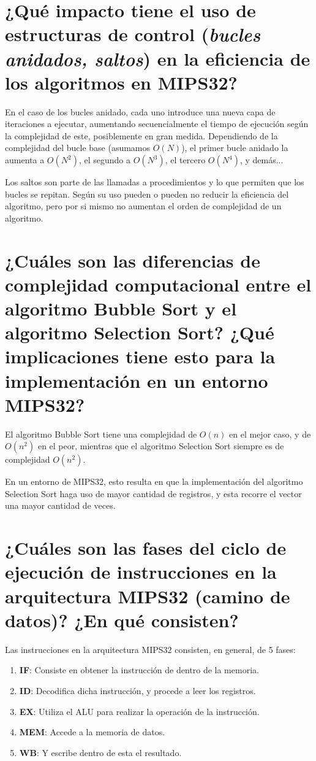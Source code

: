 \documentclass[titlepage]{article}
\begin{document}
\section*{¿Qué impacto tiene el uso de estructuras de control (\emph{bucles anidados, saltos}) en la eficiencia de los algoritmos en MIPS32?}

En el caso de los bucles anidado, cada uno introduce una nueva capa de iteraciones a ejecutar, aumentando secuencialmente el tiempo de ejecución según la complejidad de este, posiblemente en gran medida. Dependiendo de la complejidad del bucle base (asumamos $O(N)$), el primer bucle anidado la aumenta a $O(N^2)$, el segundo a $O(N^3)$, el tercero $O(N^4)$, y demás...

Los saltos son parte de las llamadas a procedimientos y lo que permiten que los bucles se repitan. Según su uso pueden o pueden no reducir la eficiencia del algoritmo, pero por si mismo no aumentan el orden de complejidad de un algoritmo.

\section*{¿Cuáles son las diferencias de complejidad computacional entre el algoritmo Bubble Sort y el algoritmo Selection Sort? ¿Qué implicaciones tiene esto para la implementación en un entorno MIPS32?}

El algoritmo Bubble Sort tiene una complejidad de $O(n)$ en el mejor caso, y de $O(n^2)$ en el peor, mientras que el algoritmo Selection Sort siempre es de complejidad $O(n^2)$.

En un entorno de MIPS32, esto resulta en que la implementación del algoritmo Selection Sort haga uso de mayor cantidad de registros, y esta recorre el vector una mayor cantidad de veces.

\section*{¿Cuáles son las fases del ciclo de ejecución de instrucciones en la arquitectura MIPS32 (camino de datos)? ¿En qué consisten?}

Las instrucciones en la arquitectura MIPS32 consisten, en general, de 5 fases: 
\begin{enumerate}
    \item \textbf{IF}: Consiste en obtener la instrucción de dentro de la memoria.
    \item \textbf{ID}: Decodifica dicha instrucción, y procede a leer los registros.
    \item \textbf{EX}: Utiliza el ALU para realizar la operación de la instrucción.
    \item \textbf{MEM}: Accede a la memoria de datos.
    \item \textbf{WB}: Y escribe dentro de esta el resultado.
\end{enumerate}
\end{document}
